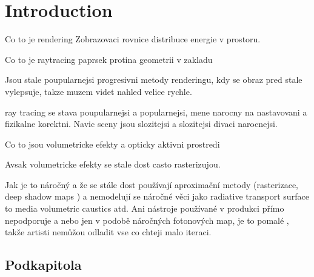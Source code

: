 \chapter{Introduction}
Co to je rendering
Zobrazovaci rovnice distribuce energie v prostoru. 

Co to je raytracing
paprsek protina geometrii v zakladu 

Jsou stale poupularnejsi progresivni metody renderingu, kdy se obraz pred stale vylepsuje, takze muzem videt nahled velice rychle.


ray tracing se stava poupularnejsi a popularnejsi, mene narocny na nastavovani a fizikalne korektni. Navic sceny jsou slozitejsi a slozitejsi divaci narocnejsi. 

Co to jsou volumetricke efekty a opticky aktivni prostredi

Avsak volumetricke efekty se stale dost casto rasterizujou.

Jak je to náročný a že se stále dost používají aproximační metody (rasterizace, deep shadow maps ) a nemodelují se náročné věci jako radiative transport surface to media volumetric caustics atd. Ani nástroje používané v produkci přímo nepodporuje a nebo jen v podobě náročných fotonových map, je to pomalé , takže artisti nemůžou odladit vse co chteji malo iteraci.



\section{Podkapitola}
